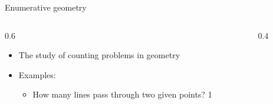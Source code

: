\documentclass{beamer}
\theoremstyle{definition}
\begin{document}
    \begin{frame}{Enumerative geometry}

      \begin{columns}[c]
        \begin{column}{0.6\hsize}
      
          \begin{itemize}
          \item The study of counting problems in geometry
          \item Examples: \begin{itemize}
          \item How many lines pass through two given points? {\color{red} 1}
          \end{itemize}
          \end{itemize}
        \end{column}
        \begin{column}{0.4\hsize}

          \centering
          \vspace*{1.2in}
          
        \end{column}
      \end{columns}
    \end{frame}
\end{document}
